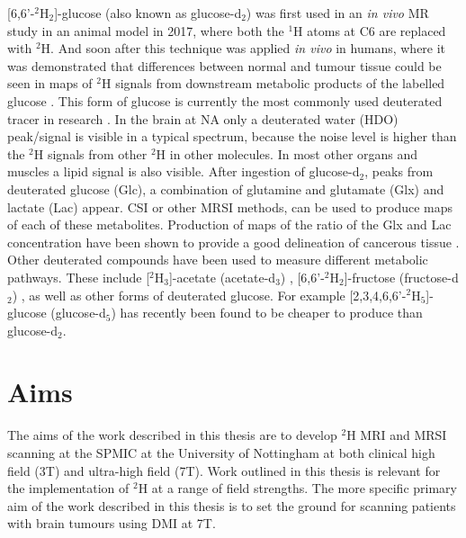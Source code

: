 [6,6'-$^2$H$_2$]-glucose (also known as glucose-d$_2$) was first used in an \textit{in vivo} MR study in an animal model \cite{Lu2017QuantitativeSpectroscopy} in 2017, where both the $^1$H atoms at C6 are replaced with $^2$H. And soon after this technique was applied \textit{in vivo} in humans, where it was demonstrated that differences between normal and tumour tissue could be seen in maps of $^2$H signals from downstream metabolic products of the labelled glucose \cite{DeFeyter2018DeuteriumVivo}. This form of glucose is currently the most commonly used deuterated tracer in research \cite{DeFeyter2018DeuteriumVivo,DeFeyter2021DeuteriumFuture,Ruhm2022Dynamic9.4T,Roig2022Deuterium7T,deGraaf2020OnImaging}. In the brain at \ac{NA} only a deuterated water (HDO) peak/signal is visible in a typical spectrum, because the noise level is higher than the $^2$H signals from other $^2$H in other molecules. In most other organs and muscles a lipid signal is also visible. After ingestion of glucose-d$_2$, peaks from deuterated glucose (Glc), a combination of glutamine and glutamate (Glx) and lactate (Lac) appear. \ac{CSI} or other \ac{MRSI} methods, can be used to produce maps of each of these metabolites. Production of maps of the ratio of the Glx and Lac concentration have been shown to provide a good delineation of cancerous tissue \cite{DeFeyter2018DeuteriumVivo,Straathof2021DeuteriumBrain}. Other deuterated compounds have been used to measure different metabolic pathways. These include [$^2$H$_3$]-acetate (acetate-d$_3$) \cite{DeFeyter2018DeuteriumVivo,Rich20201HVivo}, [6,6'-$^2$H$_2$]-fructose (fructose-d$_2$) \cite{Zhang202366-2H2Cancer}, as well as other forms of deuterated glucose. For example [2,3,4,6,6'-$^2$H$_5$]-glucose (glucose-d$_5$) \cite{Zou2023AImaging} has recently been found to be cheaper to produce than glucose-d$_2$.


\section{Aims}

The aims of the work described in this thesis are to develop $^2$H \ac{MRI} and \ac{MRSI} scanning at the \ac{SPMIC} at the University of Nottingham at both clinical high field (3T) and ultra-high field (7T). Work outlined in this thesis is relevant for the implementation of $^2$H at a range of field strengths. The more specific primary aim of the work described in this thesis is to set the ground for scanning patients with brain tumours using DMI at 7T.

